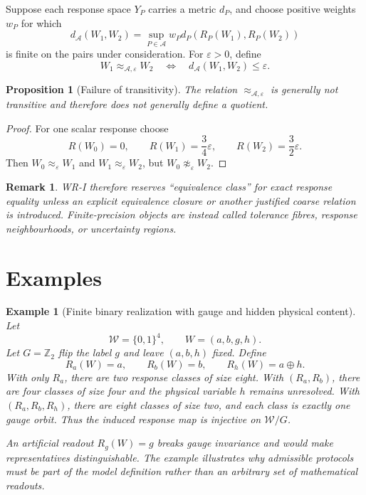 \documentclass[11pt]{article}
\newtheorem{proposition}[definition]{Proposition}
\newtheorem{example}[definition]{Example}
\newtheorem{remark}[definition]{Remark}
\newcommand{\W}{\mathcal W}
\newcommand{\Acal}{\mathcal A}
\begin{document}
Suppose each response space $Y_P$ carries a metric $d_P$, and choose positive
weights $w_P$ for which
\[
d_{\Acal}(W_1,W_2)
=
\sup_{P\in\Acal}w_P d_P(R_P(W_1),R_P(W_2))
\]
is finite on the pairs under consideration. For $\varepsilon>0$, define
\[
W_1\approx_{\Acal,\varepsilon}W_2
\quad\Longleftrightarrow\quad
 d_{\Acal}(W_1,W_2)\le\varepsilon.
\]

\begin{proposition}[Failure of transitivity]\label{prop:tolerance}
The relation $\approx_{\Acal,\varepsilon}$ is generally not transitive and
therefore does not generally define a quotient.
\end{proposition}

\begin{proof}
For one scalar response choose
\[
R(W_0)=0,
\qquad
R(W_1)=\frac34\varepsilon,
\qquad
R(W_2)=\frac32\varepsilon.
\]
Then $W_0\approx_\varepsilon W_1$ and
$W_1\approx_\varepsilon W_2$, but
$W_0\not\approx_\varepsilon W_2$.
\end{proof}

\begin{remark}
WR-I therefore reserves ``equivalence class'' for exact response equality
unless an explicit equivalence closure or another justified coarse relation is
introduced. Finite-precision objects are instead called tolerance fibres,
response neighbourhoods, or uncertainty regions.
\end{remark}

\section{Examples}

\begin{example}[Finite binary realization with gauge and hidden physical content]
Let
\[
\W=\{0,1\}^4,
\qquad
W=(a,b,g,h).
\]
Let $G=\mathbb Z_2$ flip the label $g$ and leave $(a,b,h)$ fixed. Define
\[
R_a(W)=a,
\qquad
R_b(W)=b,
\qquad
R_h(W)=a\oplus h.
\]
With only $R_a$, there are two response classes of size eight. With
$(R_a,R_b)$, there are four classes of size four and the physical variable $h$
remains unresolved. With $(R_a,R_b,R_h)$, there are eight classes of size two,
and each class is exactly one gauge orbit. Thus the induced response map is
injective on $\W/G$.

An artificial readout $R_g(W)=g$ breaks gauge invariance and would make
representatives distinguishable. The example illustrates why admissible
protocols must be part of the model definition rather than an arbitrary set of
mathematical readouts.
\end{example}
\end{document}

